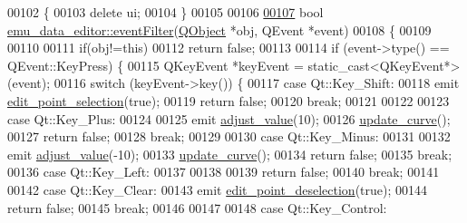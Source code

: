 \begin{DoxyCode}
00102 \{
00103     \textcolor{keyword}{delete} ui;
00104 \}
00105 
00106 
\hypertarget{a00093_source_l00107}{}\hyperlink{a00008_a48f610d23d17b2679113ea351d0968e4}{00107} \textcolor{keywordtype}{bool} \hyperlink{a00008_a48f610d23d17b2679113ea351d0968e4}{emu\_data\_editor::eventFilter}(\hyperlink{a00059}{QObject} *obj, QEvent *event)
00108 \{
00109 
00110 
00111     \textcolor{keywordflow}{if}(obj!=\textcolor{keyword}{this})
00112         \textcolor{keywordflow}{return} \textcolor{keyword}{false};
00113 
00114         \textcolor{keywordflow}{if} (event->type() == QEvent::KeyPress) \{
00115             QKeyEvent *keyEvent = \textcolor{keyword}{static\_cast<}QKeyEvent*\textcolor{keyword}{>}(event);
00116             \textcolor{keywordflow}{switch} (keyEvent->key()) \{
00117             \textcolor{keywordflow}{case} Qt::Key\_Shift:
00118                     emit \hyperlink{a00008_a9aa2af0c329358fd96f7fb6b7f02bfe1}{edit\_point\_selection}(\textcolor{keyword}{true});
00119                   \textcolor{keywordflow}{return} \textcolor{keyword}{false};
00120                  \textcolor{keywordflow}{break};
00121 
00122 
00123             \textcolor{keywordflow}{case} Qt::Key\_Plus:
00124 
00125                     emit \hyperlink{a00008_a74d292de22b341313df1852cb1033704}{adjust\_value}(10);
00126                     \hyperlink{a00008_a15cbcf5f0a17281468800f47898f60c1}{update\_curve}();
00127                     \textcolor{keywordflow}{return} \textcolor{keyword}{false};
00128                  \textcolor{keywordflow}{break};
00129 
00130             \textcolor{keywordflow}{case} Qt::Key\_Minus:
00131 
00132                     emit \hyperlink{a00008_a74d292de22b341313df1852cb1033704}{adjust\_value}(-10);
00133                     \hyperlink{a00008_a15cbcf5f0a17281468800f47898f60c1}{update\_curve}();
00134                     \textcolor{keywordflow}{return} \textcolor{keyword}{false};
00135                 \textcolor{keywordflow}{break};
00136             \textcolor{keywordflow}{case} Qt::Key\_Left:
00137 
00138 
00139                     \textcolor{keywordflow}{return} \textcolor{keyword}{false};
00140                 \textcolor{keywordflow}{break};
00141 
00142             \textcolor{keywordflow}{case} Qt::Key\_Clear:
00143                     emit \hyperlink{a00008_a2b9629d20c2b97c01bf8486c89fd0148}{edit\_point\_deselection}(\textcolor{keyword}{true});
00144                     \textcolor{keywordflow}{return} \textcolor{keyword}{false};
00145                      \textcolor{keywordflow}{break};
00146 
00147 
00148             \textcolor{keywordflow}{case} Qt::Key\_Control:

\end{DoxyCode}
